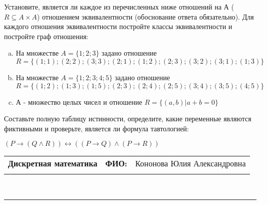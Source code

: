 \documentclass[10pt]{exam}
\newcommand{\class}{Дискретная математика}
\newcommand{\examdate}{}
\begin{document}
\begin{questions}
\question
Установите, является ли каждое из перечисленных ниже отношений на А ($R \subseteq A \times A$) отношением эквивалентности (обоснование ответа обязательно). Для каждого отношения эквивалентности постройте классы 
эквивалентности и постройте граф отношения:
\begin{enumerate} [a)]\setcounter{enumi}{0}
\item На множестве $A = \{1; 2; 3\}$ задано отношение $R = \{(1; 1); (2; 2); (3; 3); (2; 1); (1; 2); (2; 3); (3; 2); (3; 1); (1; 3)\}$
\item На множестве $A = \{1; 2; 3; 4; 5\}$ задано отношение $R = \{(1; 2); (1; 3); (1; 5); (2; 3); (2; 4); (2; 5); (3; 4); (3; 5); (4; 5)\}$
\item А - множество целых чисел и отношение $R = \{(a,b)|a + b = 0\}$
\end{enumerate}\question Составьте полную таблицу истинности, определите, какие переменные являются фиктивными и проверьте, является ли формула тавтологией:

$(P \rightarrow (Q \land R)) \leftrightarrow ((P \rightarrow Q) \land (P \rightarrow R))$

\end{questions}
\newpage
\begin{flushright}
\begin{tabular}{p{2.8in} r l}
\textbf{\class} & \textbf{ФИО:} &Кононова Юлия Александровна
\\

\textbf{\examdate} &&\\
\end{tabular}\\
\end{flushright}
\rule[1ex]{\textwidth}{.1pt}
\end{document}
